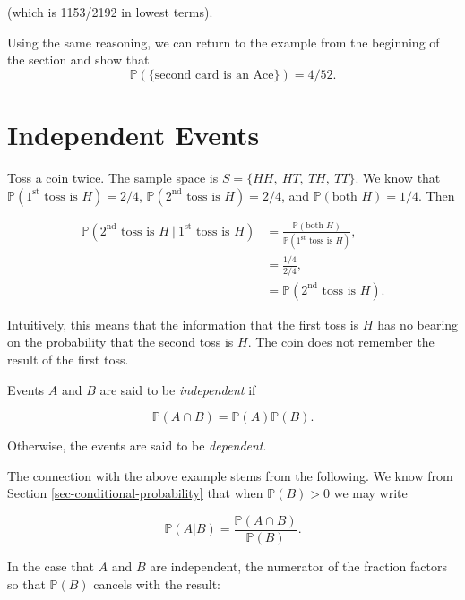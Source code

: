 \documentclass[]{book}
\numberwithin{equation}{chapter}
\numberwithin{figure}{chapter}
\theoremstyle{plain}
\theoremstyle{definition}
\theoremstyle{remark}
\theoremstyle{definition}
\theoremstyle{definition}
\theoremstyle{remark}
\let\BeginKnitrBlock\begin \let\EndKnitrBlock\end
\begin{document}
(which is 1153/2192 in lowest terms).

Using the same reasoning, we can return to the example from the
beginning of the section and show that \[ \mathbb{P}(\{ \mbox{second
card is an Ace} \} )=4/52.
\]

\section{Independent Events}\label{sec-independent-events}

Toss a coin twice. The sample space is \(S= \{ HH,\ HT,\ TH,\ TT \} \).
We know that \(\mathbb{P}(1^{\mathrm{st}}\mbox{ toss is }H)=2/4\),
\(\mathbb{P}(2^{\mathrm{nd}}\mbox{ toss is }H)=2/4\), and
\(\mathbb{P}(\mbox{both }H)=1/4\). Then

\begin{align*} 
\mathbb{P}(2^{\mathrm{nd}}\mbox{ toss is }H\ \vert \ 1^{\mathrm{st}}\mbox{ toss is }H) & =\frac{\mathbb{P}(\mbox{both }H)}{\mathbb{P}(1^{\mathrm{st}}\mbox{ toss is }H)}, \\
 & =\frac{1/4}{2/4},\\
 & =\mathbb{P}(2^{\mathrm{nd}}\mbox{ toss is }H).
\end{align*}

Intuitively, this means that the information that the first toss is
\(H\) has no bearing on the probability that the second toss is \(H\).
The coin does not remember the result of the first toss.

\bigskip

\BeginKnitrBlock{definition}
\protect\hypertarget{def:unnamed-chunk-168}{}{\label{def:unnamed-chunk-168}}Events
\(A\) and \(B\) are said to be \emph{independent} if

\begin{equation}
\mathbb{P}(A\cap B)=\mathbb{P}(A)\mathbb{P}(B).
\end{equation}

Otherwise, the events are said to be \emph{dependent}.
\EndKnitrBlock{definition}

The connection with the above example stems from the following. We know
from Section \ref{sec-conditional-probability} that when
\(\mathbb{P}(B)>0\) we may write

\begin{equation}
\mathbb{P}(A|B)=\frac{\mathbb{P}(A\cap B)}{\mathbb{P}(B)}.
\end{equation}

In the case that \(A\) and \(B\) are independent, the numerator of the
fraction factors so that \(\mathbb{P}(B)\) cancels with the result:
\end{document}
